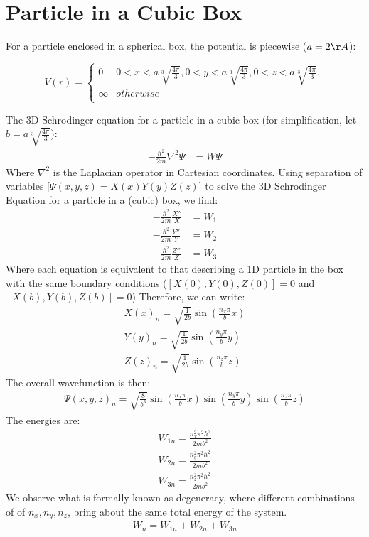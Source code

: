 \documentclass{article}
\numberwithin{equation}{section}
\begin{document}
\section*{Particle in a Cubic Box}
For a particle enclosed in a spherical box, the potential is piecewise ($a=2\AA$):
\begin{center}
$$
V(r) =
\begin{cases}
0 & 0 <x <a\sqrt[3]{\frac{4\pi}{3}}, 0 <y <a\sqrt[3]{\frac{4\pi}{3}},0 <z <a\sqrt[3]{\frac{4\pi}{3}}, \\
\infty & otherwise\\
\end{cases}
$$
\end{center}
The 3D Schrodinger equation for a particle in a cubic box (for simplification, let $b=a\sqrt[3]{\frac{4\pi}{3}}$):
\begin{align*}
	-\frac{\hbar^2}{2m}\nabla^2\Psi &= W\Psi
\end{align*}
Where $\nabla^2$ is the Laplacian operator in Cartesian coordinates. Using separation of variables [$\Psi(x,y,z)=X(x)Y(y)Z(z)$] to solve the 3D Schrodinger Equation for a particle in a (cubic) box, we find:
\begin{align*}
	-\frac{\hbar^2}{2m}\frac{X''}{X} &= W_1
\\	-\frac{\hbar^2}{2m}\frac{Y''}{Y} &= W_2
\\	-\frac{\hbar^2}{2m}\frac{Z''}{Z} &= W_3
\end{align*}
Where each equation is equivalent to that describing a 1D particle in the box with the same boundary conditions ($[X(0),Y(0),Z(0)]=0$ and $[X(b),Y(b),Z(b)]=0$) Therefore, we can write:
\begin{align*}
	X(x)_{n}=\sqrt{\frac{1}{2b}}\sin (\frac{n_x \pi}{b}x)
\\	Y(y)_{n}=\sqrt{\frac{1}{2b}}\sin (\frac{n_y \pi}{b}y)
\\	Z(z)_{n}=\sqrt{\frac{1}{2b}}\sin (\frac{n_z \pi}{b}z)
\end{align*}
The overall wavefunction is then:
\begin{align*}
	\Psi(x,y,z)_{n}=\sqrt{\frac{8}{b^3}}\sin (\frac{n_x \pi}{b}x)\sin (\frac{n_y \pi}{b}y)\sin (\frac{n_z \pi}{b}z)
\end{align*}
The energies are:
\begin{align*}
	W_{1n}=\frac{n_x^2\pi^2\hbar^2}{2mb^2}
\\	W_{2n}=\frac{n_y^2\pi^2\hbar^2}{2mb^2}
\\	W_{3n}=\frac{n_z^2\pi^2\hbar^2}{2mb^2}
\end{align*}
We observe what is formally known as degeneracy, where different combinations of of $n_x,n_y,n_z$, bring about the same total energy of the system.
\begin{align*}
	W_{n}=W_{1n}+W_{2n}+W_{3n}
\end{align*}
\end{document}
